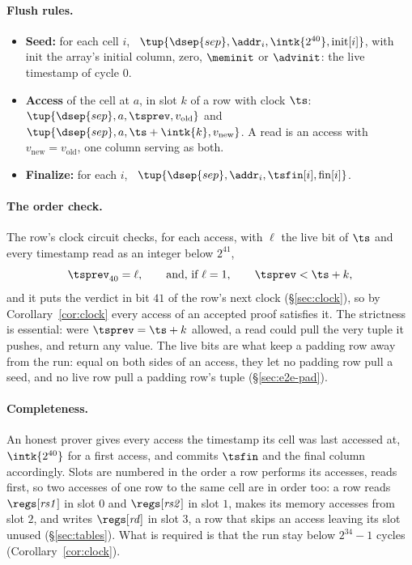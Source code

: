 \paragraph{Flush rules.}
\begin{itemize}
\item \textbf{Seed:} for each cell $i$, \push\ $\tup{\dsep{sep},\addr_i,\intk{2^{40}},\mathrm{init}[i]}$, with $\mathrm{init}$ the array's initial column, zero, $\meminit$ or $\advinit$: the live timestamp of cycle $0$.
\item \textbf{Access} of the cell at $a$, in slot $k$ of a row with clock $\ts$: \pull\ $\tup{\dsep{sep},a,\tsprev,v_{\mathrm{old}}}$ and \push\ $\tup{\dsep{sep},a,\ts+\intk{k},v_{\mathrm{new}}}$. A read is an access with $v_{\mathrm{new}}=v_{\mathrm{old}}$, one column serving as both.
\item \textbf{Finalize:} for each $i$, \pull\ $\tup{\dsep{sep},\addr_i,\tsfin[i],\mathrm{fin}[i]}$.
\end{itemize}

\paragraph{The order check.} The row's clock circuit checks, for each access, with $\ell$ the live bit of $\ts$ and every timestamp read as an integer below $2^{41}$,
\begin{equation}\label{eq:order}
  \tsprev_{40}=\ell,\qquad\text{and, if }\ell=1,\qquad \tsprev<\ts+k ,
\end{equation}
and it puts the verdict in bit $41$ of the row's next clock (\S\ref{sec:clock}), so by Corollary~\ref{cor:clock} every access of an accepted proof satisfies it. The strictness is essential: were $\tsprev=\ts+k$ allowed, a read could pull the very tuple it pushes, and return any value. The live bits are what keep a padding row away from the run: equal on both sides of an access, they let no padding row pull a seed, and no live row pull a padding row's tuple (\S\ref{sec:e2e-pad}).

\paragraph{Completeness.} An honest prover gives every access the timestamp its cell was last accessed at, $\intk{2^{40}}$ for a first access, and commits $\tsfin$ and the final column accordingly. Slots are numbered in the order a row performs its accesses, reads first, so two accesses of one row to the same cell are in order too: a row reads $\regs[\mathit{rs1}]$ in slot $0$ and $\regs[\mathit{rs2}]$ in slot $1$, makes its memory accesses from slot $2$, and writes $\regs[\mathit{rd}]$ in slot $3$, a row that skips an access leaving its slot unused (\S\ref{sec:tables}). What is required is that the run stay below $2^{34}-1$ cycles (Corollary~\ref{cor:clock}).

